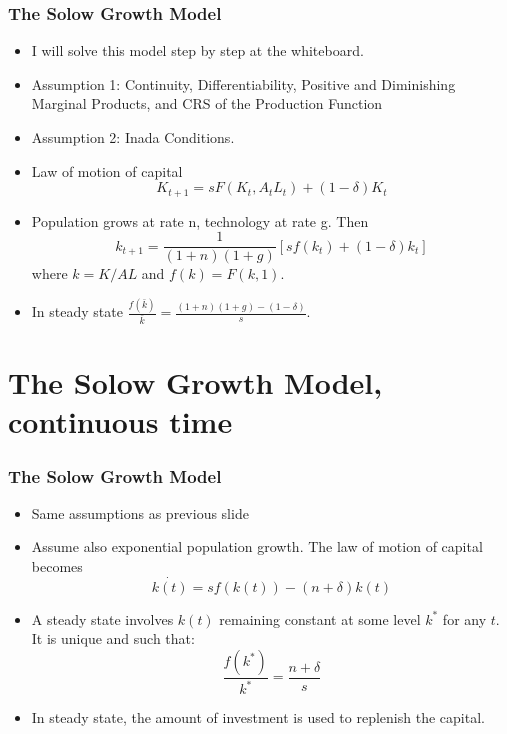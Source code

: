 \documentclass[11pt]{beamer}
\begin{document}
\begin{frame}
\frametitle{The Solow Growth Model}
\begin{itemize}
	\item I will solve this model step by step at the whiteboard.
	\item Assumption 1: Continuity, Differentiability, Positive and Diminishing Marginal Products, and CRS of the Production Function
	\item Assumption 2: Inada Conditions.
	\item Law of motion of capital
\begin{equation*}
K_{t+1} = s F(K_t, A_t L_t) + (1-\delta) K_t
\end{equation*}
	\item Population grows at rate n, technology at rate g. Then
\begin{equation*}
k_{t+1} = \frac{1}{(1+n)(1+g)}[s f(k_t) + (1-\delta) k_t]
\end{equation*}
where $k=K/AL$ and $f(k)=F(k,1)$.
	\item In steady state $\frac{f(\bar{k})}{\bar{k}} = \frac{(1+n)(1+g) - (1-\delta)}{s}$.
\end{itemize}
\end{frame}


\section{The Solow Growth Model, continuous time}




\begin{frame}
\frametitle{The Solow Growth Model}
\begin{itemize}\itemsep2ex
	\item Same assumptions as previous slide
	\item Assume also exponential population growth. The law of motion of capital becomes
\begin{equation*}
\dot{k(t)} = s f (k(t)) - (n+\delta) k(t)
\end{equation*}
	\item A steady state involves $k(t)$ remaining constant at some level $k^*$ for any $t$. It is unique and such that:
\begin{equation*}
\frac{f(k^*)}{k^*} = \frac{n+\delta}{s}
\end{equation*}
	\item In steady state, the amount of investment is used to replenish the capital.
\end{itemize}
\end{frame}
\end{document}

